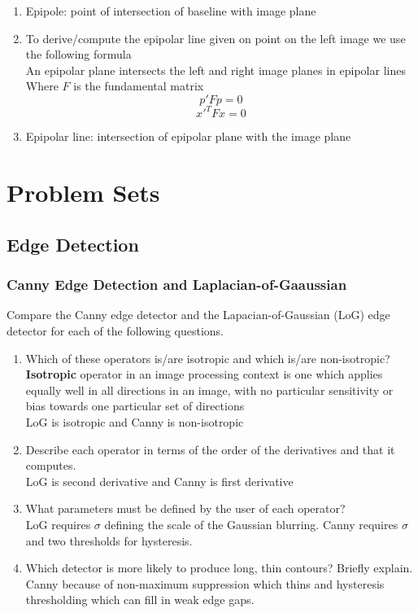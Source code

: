 \documentclass[12pt,letterpaper]{article}
\begin{document}
\begin{enumerate}
\begin{figure}[h!]
    \end{figure}
    \color{red}
    \begin{enumerate}
        \item Epipole: point of intersection of baseline with image plane
        \item To derive/compute the epipolar line given on point on the left image we use the following formula\\
         An epipolar plane intersects the left and right image planes in epipolar lines\\
        Where $F$ is the fundamental matrix\\
       
        $$p'Fp = 0$$
        $$x'^{T}Fx = 0$$
        \item Epipolar line: intersection of epipolar plane with the image 
plane
    \end{enumerate}
    \color{black}
\end{enumerate}
\section{Problem Sets}
\subsection{Edge Detection}

\subsubsection{Canny Edge Detection and Laplacian-of-Gaaussian}
Compare the Canny edge detector and the Lapacian-of-Gaussian (LoG) edge detector for each of the following questions. 
\begin{enumerate}
    \item Which of these operators is/are isotropic and which is/are non-isotropic? \\
    \color{red}
    \textbf{Isotropic} operator in an image processing context is one which applies equally well in all directions in an image, with no particular sensitivity or bias towards one particular set of directions\\
    LoG is isotropic and Canny is non-isotropic
    \color{black}
    \item Describe each operator in terms of the order of the derivatives and that it computes.\\
    \color{red}
    LoG is second derivative and Canny is first derivative 
    \color{black}
    \item What parameters must be defined by the user of each operator? \\
    \color{red}
    LoG requires $\sigma$ defining the scale of the Gaussian blurring. Canny requires 
    $\sigma$ and two thresholds for hysteresis. 
    \color{black}
    \item Which detector is more likely to produce long, thin contours? Briefly explain. \\
    \color{red}
    Canny because of non-maximum suppression which thins and hysteresis thresholding which can fill in
    weak edge gaps. 
    \color{black}
\end{enumerate}
\end{document}

